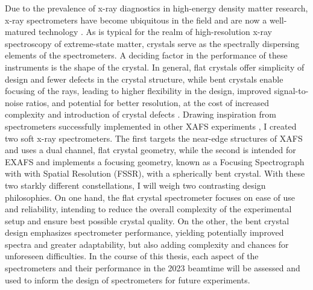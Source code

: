 Due to the prevalence of x-ray diagnostics in high-energy density matter research, x-ray spectrometers have become ubiquitous in the field and are now a well-matured technology \citep{renner2019challenges}. As is typical for the realm of high-resolution x-ray 
spectroscopy of extreme-state matter, crystals serve as the spectrally dispersing elements of the spectrometers. A deciding factor in the performance of these instruments is the shape of the crystal. In general, flat crystals offer simplicity of design and fewer defects in the crystal structure, while bent crystals enable focusing of the rays, leading to higher flexibility in the design, improved signal-to-noise ratios, and potential for better resolution, at the cost of increased complexity and introduction of crystal defects \citep{renner2019challenges,kunze2009introduction}. Drawing inspiration from 
spectrometers successfully implemented in other XAFS 
experiments \citep{levy2010double, 
torchio2016probing, hall1988experimental}, I created two soft x-ray spectrometers. The first targets the near-edge structures of XAFS and uses a 
dual channel, flat crystal geometry, while the second is intended 
for EXAFS and implements a focusing geometry, known 
as a Focusing Spectrograph with with Spatial 
Resolution (FSSR), with a 
spherically bent crystal. With these two starkly different constellations, I will weigh two contrasting design philosophies. On one hand, the flat crystal spectrometer focuses on ease of use and reliability, intending to reduce the overall complexity of the experimental setup and ensure best possible crystal quality. On the other, the bent crystal design emphasizes spectrometer performance, yielding potentially improved spectra and greater adaptability, but also adding complexity and chances for unforeseen difficulties. In the course of this thesis, each aspect of the spectrometers and their performance in the 2023 beamtime will be assessed and used to inform the design of spectrometers for future experiments.

